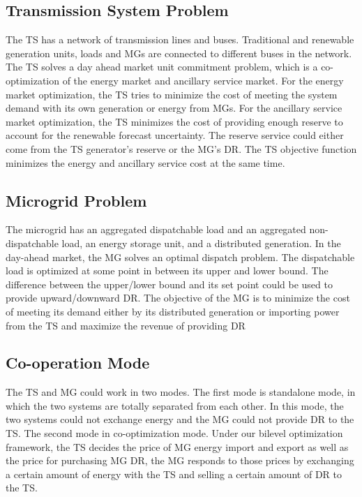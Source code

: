 
\subsection{Transmission System Problem}
The TS has a network of transmission lines and buses. Traditional and renewable generation units, loads and MGs are connected to different buses in the network. The TS solves a day ahead market unit commitment problem, which is a co-optimization of the energy market and ancillary service market. For the energy market optimization, the TS tries to minimize the cost of meeting the system demand with its own generation or energy from MGs. For the ancillary service market optimization, the TS minimizes the cost of providing enough reserve to account for the renewable forecast uncertainty. The reserve service could either come from the TS generator's reserve or the MG's DR. The TS objective function minimizes the energy and ancillary service cost at the same time.  

\subsection{Microgrid Problem}
The microgrid has an aggregated dispatchable load and an aggregated non-dispatchable load, an energy storage unit, and a distributed generation. In the day-ahead market, the MG solves an optimal dispatch problem. The dispatchable load is optimized at some point in between its upper and lower bound. The difference between the upper/lower bound and its set point could be used to provide upward/downward DR. The objective of the MG is to minimize the cost of meeting its demand either by its distributed generation or importing power from the TS and maximize the revenue of providing DR

\subsection{Co-operation Mode}
The TS and MG could work in two modes. The first mode is standalone mode, in which the two systems are totally separated from each other. In this mode, the two systems could not exchange energy and the MG could not provide DR to the TS. The second mode in co-optimization mode. Under our bilevel optimization framework, the TS decides the price of MG energy import and export as well as the price for purchasing MG DR, the MG responds to those prices by exchanging a certain amount of energy with the TS and selling a certain amount of DR to the TS.

